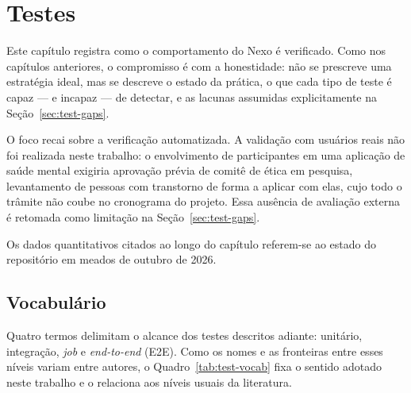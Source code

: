 \chapter{Testes}\label{cap:testes}

Este capítulo registra como o comportamento do Nexo é verificado. Como nos
capítulos anteriores, o compromisso é com a honestidade: não se prescreve uma
estratégia ideal, mas se descreve o estado da prática, o que cada tipo de teste
é capaz --- e incapaz --- de detectar, e as lacunas assumidas explicitamente na
Seção~\ref{sec:test-gaps}.

O foco recai sobre a verificação automatizada. A validação com usuários reais
não foi realizada neste trabalho: o envolvimento de participantes em uma
aplicação de saúde mental exigiria aprovação prévia de comitê de ética em
pesquisa, levantamento de pessoas com transtorno de forma a aplicar com elas,
cujo todo o trâmite não coube no cronograma do projeto. Essa ausência de
avaliação externa é retomada como limitação na Seção~\ref{sec:test-gaps}.

Os dados quantitativos citados ao longo do capítulo referem-se ao estado do
repositório em meados de outubro de 2026.

\section{Vocabulário}\label{sec:test-vocab}

Quatro termos delimitam o alcance dos testes descritos adiante: unitário,
integração, \textit{job} e \textit{end-to-end} (E2E). Como os nomes e as
fronteiras entre esses níveis variam entre autores, o Quadro~\ref{tab:test-vocab}
fixa o sentido adotado neste trabalho e o relaciona aos níveis usuais da
literatura.

